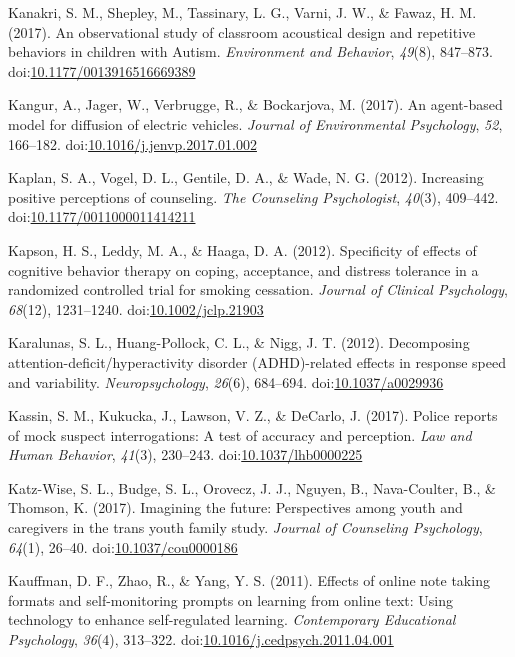 \documentclass[english,man]{apa6}
\begin{document}
\hypertarget{ref-Kanakri2017}{}
Kanakri, S. M., Shepley, M., Tassinary, L. G., Varni, J. W., \& Fawaz,
H. M. (2017). An observational study of classroom acoustical design and
repetitive behaviors in children with Autism. \emph{Environment and
Behavior}, \emph{49}(8), 847--873.
doi:\href{https://doi.org/10.1177/0013916516669389}{10.1177/0013916516669389}

\hypertarget{ref-Kangur2017}{}
Kangur, A., Jager, W., Verbrugge, R., \& Bockarjova, M. (2017). An
agent-based model for diffusion of electric vehicles. \emph{Journal of
Environmental Psychology}, \emph{52}, 166--182.
doi:\href{https://doi.org/10.1016/j.jenvp.2017.01.002}{10.1016/j.jenvp.2017.01.002}

\hypertarget{ref-Kaplan2012}{}
Kaplan, S. A., Vogel, D. L., Gentile, D. A., \& Wade, N. G. (2012).
Increasing positive perceptions of counseling. \emph{The Counseling
Psychologist}, \emph{40}(3), 409--442.
doi:\href{https://doi.org/10.1177/0011000011414211}{10.1177/0011000011414211}

\hypertarget{ref-Kapson2012}{}
Kapson, H. S., Leddy, M. A., \& Haaga, D. A. (2012). Specificity of
effects of cognitive behavior therapy on coping, acceptance, and
distress tolerance in a randomized controlled trial for smoking
cessation. \emph{Journal of Clinical Psychology}, \emph{68}(12),
1231--1240.
doi:\href{https://doi.org/10.1002/jclp.21903}{10.1002/jclp.21903}

\hypertarget{ref-Karalunas2012}{}
Karalunas, S. L., Huang-Pollock, C. L., \& Nigg, J. T. (2012).
Decomposing attention-deficit/hyperactivity disorder (ADHD)-related
effects in response speed and variability. \emph{Neuropsychology},
\emph{26}(6), 684--694.
doi:\href{https://doi.org/10.1037/a0029936}{10.1037/a0029936}

\hypertarget{ref-Kassin2017}{}
Kassin, S. M., Kukucka, J., Lawson, V. Z., \& DeCarlo, J. (2017). Police
reports of mock suspect interrogations: A test of accuracy and
perception. \emph{Law and Human Behavior}, \emph{41}(3), 230--243.
doi:\href{https://doi.org/10.1037/lhb0000225}{10.1037/lhb0000225}

\hypertarget{ref-Katz-Wise2017}{}
Katz-Wise, S. L., Budge, S. L., Orovecz, J. J., Nguyen, B.,
Nava-Coulter, B., \& Thomson, K. (2017). Imagining the future:
Perspectives among youth and caregivers in the trans youth family study.
\emph{Journal of Counseling Psychology}, \emph{64}(1), 26--40.
doi:\href{https://doi.org/10.1037/cou0000186}{10.1037/cou0000186}

\hypertarget{ref-Kauffman2011}{}
Kauffman, D. F., Zhao, R., \& Yang, Y. S. (2011). Effects of online note
taking formats and self-monitoring prompts on learning from online text:
Using technology to enhance self-regulated learning. \emph{Contemporary
Educational Psychology}, \emph{36}(4), 313--322.
doi:\href{https://doi.org/10.1016/j.cedpsych.2011.04.001}{10.1016/j.cedpsych.2011.04.001}
\end{document}
